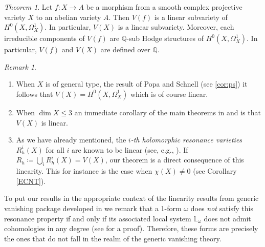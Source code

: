 \documentclass[a4paper,12pt,reqno]{amsart}
\theoremstyle{plain}
\theoremstyle{definition}
\theoremstyle{remark}
\newtheorem{remark}[theorem]{Remark}
\newcommand{\Q}{\mathbb Q}
\newtheorem{alphtheorem}{Theorem}
\newcommand{\bbL}{\mathbb{L}}
\begin{document}
\begin{alphtheorem}\label{main1}
Let $f: X\to A$ be a morphism from a smooth complex projective variety $X$ to an abelian variety $A$. Then 
$V(f)$ is a linear subvariety of $H^0(X, \Omega_X^1)$. In particular, $V(X)$ is a linear subvariety. Moreover, each irreducible components of $V(f)$ are $\Q$-sub Hodge structures of $H^0(X, \Omega_X^1)$. In particular, $V(f)$ and $V(X)$ are defined over $\Q$.

\end{alphtheorem}
\begin{remark}
\begin{enumerate}
	\item When $X$ is of general type, the 
	result of Popa and Schnell (see \ref{cor:ps}) 
	it follows that $V(X) = H^0(X,\Omega_X^1)$ which is of course
	linear. 
	\item  When $\dim X\leq 3$ an immediate corollary of the main theorems in \cite{SS19} and \cite{HS19} is that $V(X)$ is linear.
	\item \label{item:resonance} As we have already mentioned, the \emph{$i$-th holomorphic resonance varieties} $R^i_h(X)$ for
	all $i$ are 
	known to be linear (see, e.g., \cite{DiPa13}). 
	If $R_h \coloneqq \bigcup_{i} R_h^	i(X)= V(X)$, our theorem is a direct consequence of
	this linearity. This 
	for instance is the case when $\chi(X)\not=0$ (see Corollary \ref{ECNT}). 
\end{enumerate}

\end{remark}

To put our results in the appropriate context of the linearity results from generic vanishing package developed
in \cite{Ara92, GL87, Sim93b}
we remark that a 1-form $\omega$ does \emph{not} satisfy this resonance property if and only if its associated local
system $\bbL_\omega$ does not
admit cohomologies in any degree (see \cite[Theorem 3]{Ara92} for a proof). Therefore, these forms are precisely the ones that do not fall in the
realm of the generic vanishing theory. 
\end{document}
